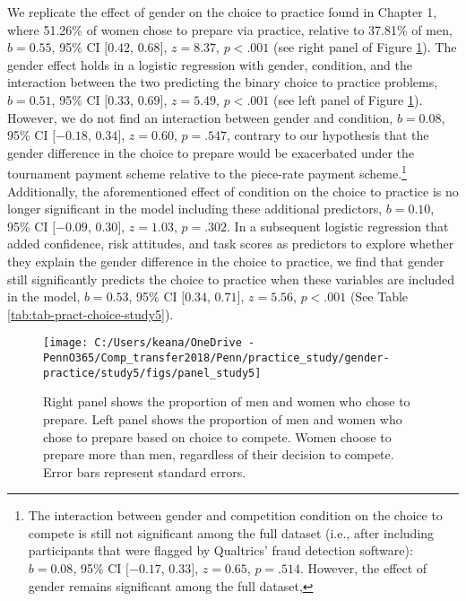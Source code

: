 \documentclass[letterpaper, nobind]{templates/ociamthesis}
\begin{document}
We replicate the effect of gender on the choice to practice found in Chapter 1, where 51.26\% of women chose to prepare via practice, relative to 37.81\% of men, \(b = 0.55\), 95\% CI \([0.42\), \(0.68]\), \(z = 8.37\), \(p < .001\) (see right panel of Figure \ref{fig:panel-study5}). The gender effect holds in a logistic regression with gender, condition, and the interaction between the two predicting the binary choice to practice problems, \(b = 0.51\), 95\% CI \([0.33\), \(0.69]\), \(z = 5.49\), \(p < .001\) (see left panel of Figure \ref{fig:panel-study5}). However, we do not find an interaction between gender and condition, \(b = 0.08\), 95\% CI \([-0.18\), \(0.34]\), \(z = 0.60\), \(p = .547\), contrary to our hypothesis that the gender difference in the choice to prepare would be exacerbated under the tournament payment scheme relative to the piece-rate payment scheme.\footnote{The interaction between gender and competition condition on the choice to compete is still not significant among the full dataset (i.e., after including participants that were flagged by Qualtrics' fraud detection software): \(b = 0.08\), 95\% CI \([-0.17\), \(0.33]\), \(z = 0.65\), \(p = .514\). However, the effect of gender remains significant among the full dataset,} Additionally, the aforementioned effect of condition on the choice to practice is no longer significant in the model including these additional predictors, \(b = 0.10\), 95\% CI \([-0.09\), \(0.30]\), \(z = 1.03\), \(p = .302\). In a subsequent logistic regression that added confidence, risk attitudes, and task scores as predictors to explore whether they explain the gender difference in the choice to practice, we find that gender still significantly predicts the choice to practice when these variables are included in the model, \(b = 0.53\), 95\% CI \([0.34\), \(0.71]\), \(z = 5.56\), \(p < .001\) (See Table \ref{tab:tab-pract-choice-study5}).

\begin{figure}

{\centering \texttt{[image: C:/Users/keana/OneDrive - PennO365/Comp\_transfer2018/Penn/practice\_study/gender-practice/study5/figs/panel\_study5]} 

}

\caption{Right panel shows the proportion of men and women who chose to prepare. Left panel shows the proportion of men and women who chose to prepare based on choice to compete. Women choose to prepare more than men, regardless of their decision to compete. Error bars represent standard errors.}\label{fig:panel-study5}
\end{figure}
\end{document}

